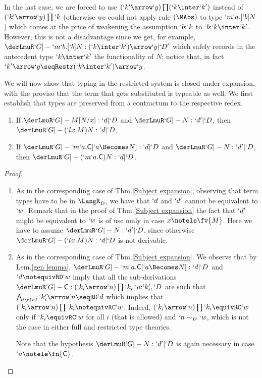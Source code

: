 \documentclass{CSML}
\begin{document}
\noindent In the last case, we are forced to use $(`k'\arrow `y)\prod (`k\inter`k')$ instead of $(`k'\arrow `y)\prod `k$ (otherwise we could not apply rule $(\MAbs)$ to type $ `m`a.[`b]N$) which comes at the price of weakening the assumption $`b{:}`k$ to $`b{:}`k\inter`k'$. 
However, this is not a disadvantage since we get, for example, $ \derLmuR `G |- `m`b.{[`b]}N : (`k\inter`k')\arrow `y | `D' $ which safely records in the antecedent type $`k\inter`k'$ the functionality of $N$; notice that, in fact $`k'\arrow `y \seqRestr (`k\inter`k')\arrow `y$.

We will now show that typing in the restricted system is closed under expansion, with the proviso that the term that gets substituted is typeable as well. 
We first establish that types are preserved from a contractum to the respective redex.

 \begin{lem} \label{lem:contractum-exp}\hfill
 \begin{enumerate}
\item \label{lem:contractum-exp-beta}
If $ \derLmuR `G |- M[N/x] : `d | `D $ and $ \derLmuR `G |- N : `d' | `D $, then $ \derLmuR `G |- (`l x.M)N : `d | `D $.

\item \label{lem:contractum-exp-mu}
If $\derLmuR `G |- {`m `a.\Cmd[`a \Becomes N]} : `d | `D $ and $\derLmuR `G |- N : `d' | `D $, then $ \derLmuR `G |- {(`m `a.\Cmd)N} : `d | `D $.
 \end{enumerate}
 \end{lem}

 \begin{proof}\hfill
 \begin{enumerate}
\item %
As in the corresponding case of Thm.\skp\ref{Subject expansion}, observing that term types have to be in $\LangR_D$, we have that $`d$ and $`d'$ cannot be equivalent to $`w$.
Remark that in the proof of Thm.\skp\ref{Subject expansion} the fact that $`d'$ might be equivalent to $`w$ is of use omly in case $x\notele \fv{M}$.
Here we have to assume $ \derLmuR `G |- N : `d' | `D $, since otherwise $ \derLmuR `G |- (`l x.M)N : `d | `D $ is not derivable.

\item %
As in the corresponding case of Thm.\skp\ref{Subject expansion}.
We observe that by Lem.\skp\ref{gen lemma}, $\derLmuR `G |- {`m `a.\Cmd[`a \Becomes N]} : `d | `D $ and $`d \notequivRD `w$ imply that all the sub-derivations $\derLmuR `G |- \Cmd : (`k_i\arrow`n)\prod `k_i | `a{:}`k'_i,`D $ are such that $\bigwedge_{i\ele I}`k'_i\arrow`n \seqRD `d$ which implies that $(`k_i\arrow`n)\prod `k_i \notequivRC `w$.
Indeed, $(`k_i\arrow`n)\prod `k_i \equivRC `w$ only if $`k_i \equivRC `w$ for all $i$ (that is allowed) and $`n \sim_D `w$, which is not the case in either full and restricted type theories.

Note that the hypothesis $\derLmuR `G |- N : `d' | `D $ is again necessary in case $`a \notele \fn{\Cmd}$. \qedhere
 \end{enumerate}
 \end{proof}
 
\end{document}
